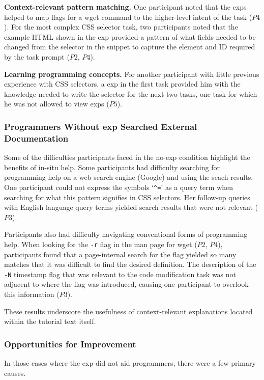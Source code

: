 {\bf Context-relevant pattern matching.}
One participant noted that the \glspl{exp} helped  to map flags for a wget command to the higher-level intent of the task ($P4$). 
For the most complex CSS selector task, two participants noted
that the example HTML shown in the \gls{exp} 
provided a pattern of what fields needed to be changed  from the selector in the snippet to capture the element and ID required by the task prompt ($P2$, $P4$).

{\bf Learning programming concepts.}
For another participant with little previous experience with CSS selectors, a \gls{exp} in  the first task provided him with the knowledge needed to write the selector for the next two tasks, one task for which he was not allowed to view \glspl{exp} ($P5$).

\subsubsection{Programmers Without \Gls{exp} Searched External Documentation}

Some of the difficulties participants faced in the no-\gls{exp} condition  highlight the benefits of in-situ help.
Some participants had difficulty searching for programming help on a web search engine (Google) and using the seach results.
One participant could not express the symbols `\texttt{\^{}=}' as a query term when searching for what  this pattern signifies in CSS selectors.
Her follow-up queries with English language query terms  yielded search results that were not relevant ($P3$).

Participants also had difficulty navigating conventional forms of programming help.
When looking for the \texttt{-r} flag in the man page for wget ($P2$, $P4$), participants found that a page-internal  search for the flag yielded so many matches that it was difficult to find the desired definition.
The description of the \texttt{-N} timestamp flag that was relevant to the code modification task was not adjacent to where the flag was introduced, causing one participant to overlook this information ($P3$).

These results underscore the usefulness of context-relevant explanations located within the tutorial text itself.

\subsubsection{Opportunities for Improvement}
In those cases where the \gls{exp} did not aid programmers, there were a few primary causes.


